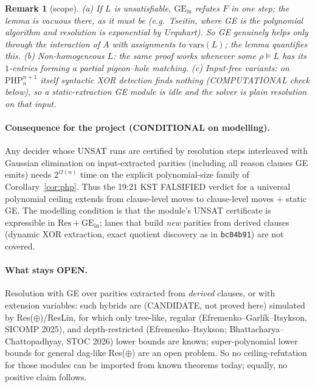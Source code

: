 \documentclass[11pt]{article}
\newtheorem{remark}[lemma]{Remark}
\begin{document}
\begin{remark}[scope]
(a) If $L$ is unsatisfiable, $\mathrm{GE}_{\mathrm{in}}$ refutes $F$ in one step; the lemma is vacuous there, as it must be (e.g.\ Tseitin, where GE is the polynomial algorithm and resolution is exponential by Urquhart). So GE genuinely helps \emph{only through} the interaction of $A$ with assignments to $\mathrm{vars}(L)$; the lemma quantifies this. (b) Non-homogeneous $L$: the same proof works whenever some $\rho\models L$ has its $1$-entries forming a partial pigeon--hole matching. (c) Input-free variants: on $\mathrm{PHP}^{n+1}_n$ itself syntactic XOR detection finds nothing (COMPUTATIONAL check below), so a static-extraction GE module is idle and the solver is plain resolution on that input.
\end{remark}

\paragraph{Consequence for the project (CONDITIONAL on modelling).} Any decider whose UNSAT runs are certified by resolution steps interleaved with Gaussian elimination on input-extracted parities (including all reason clauses GE emits) needs $2^{\Omega(n)}$ time on the explicit polynomial-size family of Corollary~\ref{cor:php}. Thus the 19:21 KST FALSIFIED verdict for a universal polynomial ceiling extends from clause-level moves to clause-level moves $+$ static GE. The modelling condition is that the module's UNSAT certificate is expressible in $\mathrm{Res}{+}\mathrm{GE}_{\mathrm{in}}$; lanes that build \emph{new} parities from derived clauses (dynamic XOR extraction, exact quotient discovery as in \texttt{bc04b91}) are not covered.

\paragraph{What stays OPEN.} Resolution with GE over parities extracted from \emph{derived} clauses, or with extension variables: such hybrids are (CANDIDATE, not proved here) simulated by Res($\oplus$)/ResLin, for which only tree-like, regular (Efremenko--Garl\'ik--Itsykson, SICOMP 2025), and depth-restricted (Efremenko--Itsykson; Bhattacharya--Chattopadhyay, STOC 2026) lower bounds are known; super-polynomial lower bounds for general dag-like Res($\oplus$) are an open problem. So no ceiling-refutation for those modules can be imported from known theorems today; equally, no positive claim follows.
\end{document}
